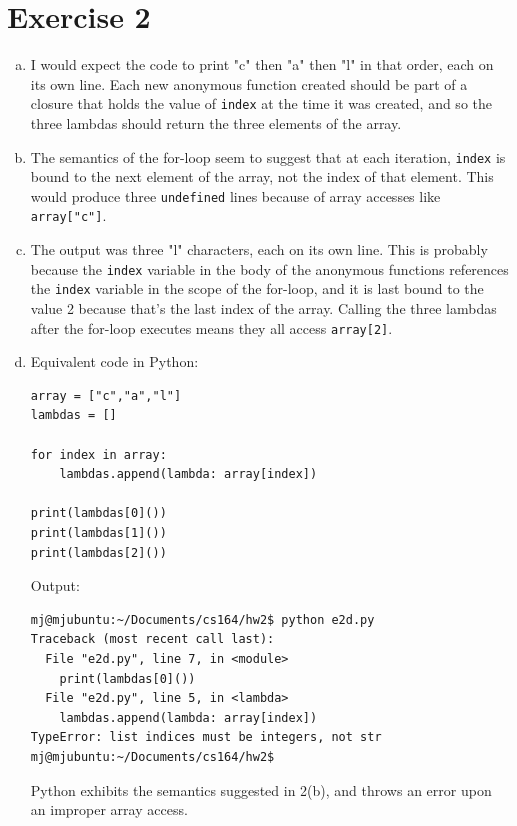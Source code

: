 \documentclass[11pt]{article}
\begin{document}
\newpage
\section*{Exercise 2}
\begin{enumerate}[(a)]
\item I would expect the code to print "c" then "a" then "l" in that order, each on its own line. Each new anonymous function created should be part of a closure that holds the value of \texttt{index} at the time it was created, and so the three lambdas should return the three elements of the array.
\item The semantics of the for-loop seem to suggest that at each iteration, \texttt{index} is bound to the next element of the array, not the index of that element. This would produce three \texttt{undefined} lines because of array accesses like \texttt{array["c"]}.
\item The output was three "l" characters, each on its own line. This is probably because the \texttt{index} variable in the body of the anonymous functions references the \texttt{index} variable in the scope of the for-loop, and it is last bound to the value 2 because that's the last index of the array. Calling the three lambdas after the for-loop executes means they all access \texttt{array[2]}.
\item Equivalent code in Python: \begin{verbatim}
array = ["c","a","l"]
lambdas = []

for index in array:
    lambdas.append(lambda: array[index])

print(lambdas[0]())
print(lambdas[1]())
print(lambdas[2]())
\end{verbatim}
Output:
\begin{verbatim}
mj@mjubuntu:~/Documents/cs164/hw2$ python e2d.py
Traceback (most recent call last):
  File "e2d.py", line 7, in <module>
    print(lambdas[0]())
  File "e2d.py", line 5, in <lambda>
    lambdas.append(lambda: array[index])
TypeError: list indices must be integers, not str
mj@mjubuntu:~/Documents/cs164/hw2$
\end{verbatim}
Python exhibits the semantics suggested in 2(b), and throws an error upon an improper array access.
\end{enumerate}


\newpage
\end{document}

